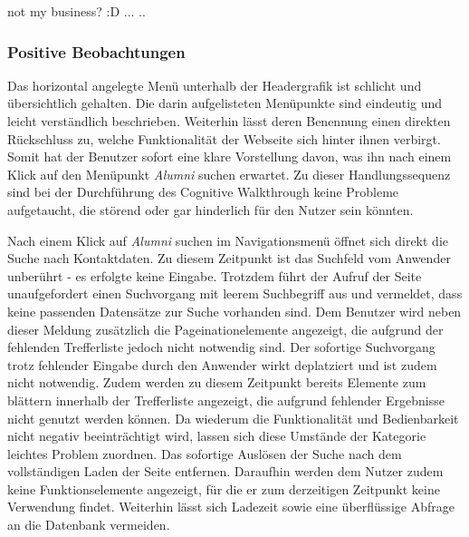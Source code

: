 {
	not my business? :D
}
{
	...
}
{
	..
}


\subsubsection*{Positive Beobachtungen}
Das horizontal angelegte Menü unterhalb der Headergrafik ist schlicht und übersichtlich gehalten. Die darin aufgelisteten Menüpunkte sind eindeutig und leicht verständlich beschrieben. Weiterhin lässt deren Benennung einen direkten Rückschluss zu, welche Funktionalität der Webseite sich hinter ihnen verbirgt. Somit hat der Benutzer sofort eine klare Vorstellung davon, was ihn nach einem Klick auf den Menüpunkt \emph{Alumni} suchen erwartet. Zu dieser Handlungssequenz sind bei der Durchführung des Cognitive Walkthrough keine Probleme aufgetaucht, die störend oder gar hinderlich für den Nutzer sein könnten. 

{
	Nach einem Klick auf \emph{Alumni} suchen im Navigationsmenü öffnet sich direkt die Suche nach Kontaktdaten. Zu diesem Zeitpunkt ist das Suchfeld vom Anwender unberührt - es erfolgte keine Eingabe. Trotzdem führt der Aufruf der Seite unaufgefordert einen Suchvorgang mit leerem Suchbegriff aus und vermeldet, dass keine passenden Datensätze zur Suche vorhanden sind. Dem Benutzer wird neben dieser Meldung zusätzlich die Pageinationelemente angezeigt, die aufgrund der fehlenden Trefferliste jedoch nicht notwendig sind.
}
{
	Der sofortige Suchvorgang trotz fehlender Eingabe durch den Anwender wirkt deplatziert und ist zudem nicht notwendig. Zudem werden zu diesem Zeitpunkt bereits Elemente zum blättern innerhalb der Trefferliste angezeigt, die aufgrund fehlender Ergebnisse nicht genutzt werden können. Da wiederum die Funktionalität und Bedienbarkeit nicht negativ beeinträchtigt wird, lassen sich diese Umstände der Kategorie leichtes Problem zuordnen.
}
{
	Das sofortige Auslösen der Suche nach dem vollständigen Laden der Seite entfernen. Daraufhin werden dem Nutzer zudem keine Funktionselemente angezeigt, für die er zum derzeitigen Zeitpunkt keine Verwendung findet. Weiterhin lässt sich Ladezeit sowie eine überflüssige Abfrage an die Datenbank vermeiden. 
} 


